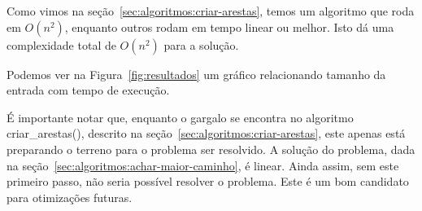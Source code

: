 \documentclass[12pt]{article}
\begin{document}
Como vimos na se\c{c}ão~\ref{sec:algoritmos:criar-arestas}, temos um algoritmo que roda em $O(n^2)$, enquanto outros rodam em tempo linear ou melhor. Isto dá uma complexidade total de $O(n^2)$ para a solu\c{c}ão.

Podemos ver na Figura~\ref{fig:resultados} um gráfico relacionando tamanho da entrada com tempo de execu\c{c}ão.

É importante notar que, enquanto o gargalo se encontra no algoritmo {\sf criar\_arestas()}, descrito na se\c{c}ão~\ref{sec:algoritmos:criar-arestas}, este apenas está preparando o terreno para o problema ser resolvido. A solu\c{c}ão do problema, dada na se\c{c}ão~\ref{sec:algoritmos:achar-maior-caminho}, é linear. Ainda assim, sem este primeiro passo, não seria possível resolver o problema. Este é um bom candidato para otimiza\c{c}ões futuras.
\end{document}

